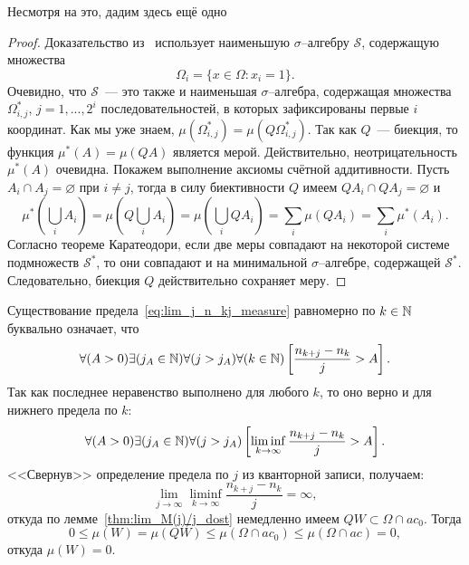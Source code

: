 Несмотря на это, дадим здесь ещё одно
\begin{proof}
	Доказательство из~\cite{connor1990almost} использует наименьшую $\sigma$--алгебру $\mathcal{S}$,
	содержащую множества
	\begin{equation}
		\Omega_i = \{x\in\Omega: x_i = 1\}
		.
	\end{equation}
	Очевидно, что $\mathcal{S}$~--- это также и наименьшая $\sigma$--алгебра, содержащая множества
	$\Omega^*_{i,j}$, $j=1,...,2^i$ последовательностей, в которых зафиксированы первые $i$ координат.
	Как мы уже знаем, $\mu(\Omega^*_{i,j}) = \mu(Q\Omega^*_{i,j})$.
	Так как $Q$~--- биекция, то функция $\mu^*(A) = \mu(QA)$ является мерой.
	Действительно, неотрицательность $\mu^*(A)$ очевидна.
	Покажем выполнение аксиомы счётной аддитивности.
	Пусть $A_i \cap A_j = \varnothing$ при $i\neq j$,
	тогда в силу биективности $Q$ имеем $QA_i \cap QA_j = \varnothing$ и
	\begin{equation}
		\mu^*\left( \bigcup_i A_i \right)
		=
		\mu\left( Q \bigcup_i A_i \right)
		=
		\mu\left( \bigcup_i QA_i \right)
		=
		\sum_i 	\mu( QA_i )
		=
		\sum_i 	\mu^*( A_i )
		.
	\end{equation}
	Согласно теореме Каратеодори,
	если две меры совпадают на некоторой системе подмножеств $\mathcal{S}^*$,
	то они совпадают и на минимальной $\sigma$--алгебре, содержащей $\mathcal{S}^*$.
	Следовательно, биекция $Q$ действительно сохраняет меру.
\end{proof}


Существование предела~\eqref{eq:lim_j_n_kj_measure}
равномерно по $k\in \mathbb{N}$
буквально означает, что
\begin{equation}
	\forall(A>0)\exists(j_A\in\mathbb{N})\forall(j > j_A)\forall(k\in\mathbb{N})
	\left[
		\frac{n_{k+j}-n_k}{j}>A
	\right]
	.
\end{equation}
Так как последнее неравенство выполнено для любого $k$,
то оно верно и для нижнего предела по $k$:
\begin{equation}
	\forall(A>0)\exists(j_A\in\mathbb{N})\forall(j > j_A)
	\left[
		\liminf_{k\to\infty}\frac{n_{k+j}-n_k}{j}>A
	\right]
	.
\end{equation}
<<Свернув>> определение предела по $j$ из кванторной записи, получаем:
\begin{equation}
	\lim_{j\to\infty}\liminf_{k\to\infty}\frac{n_{k+j}-n_k}{j} = \infty
	,
\end{equation}
откуда по лемме~\ref{thm:lim_M(j)/j_dost} немедленно имеем $QW \subset \Omega\cap ac_0$.
Тогда
\begin{equation}
	0 \leq \mu(W) = \mu(QW) \leq \mu(\Omega\cap ac_0) \leq \mu(\Omega\cap ac) = 0
	,
\end{equation}
откуда $\mu(W)=0$.

